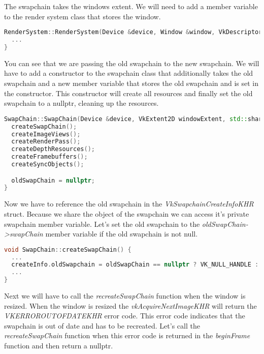 \documentclass[12pt]{report} \usepackage{preamble}
\begin{document}
The swapchain takes the windows extent. We will need to add a member variable to the render system class that stores the window.

\begin{lstlisting}[language=C++]
RenderSystem::RenderSystem(Device &device, Window &window, VkDescriptorSetLayout descriptorSetLayout) : device{device}, window{window} {
  ...
}
\end{lstlisting}

You can see that we are passing the old swapchain to the new swapchain. We will have to add a constructor to the swapchain class that additionally takes the old swapchain
and a new member variable that stores the old swapchain and is set in the constructor. This constructor will create all resources and finally set the old swapchain to a nullptr,
cleaning up the resources.

\begin{lstlisting}[language=C++]
SwapChain::SwapChain(Device &device, VkExtent2D windowExtent, std::shared_ptr<SwapChain> oldSwapChain) : device{device}, windowExtent{windowExtent}, oldSwapChain{oldSwapChain} {
  createSwapChain();
  createImageViews();
  createRenderPass();
  createDepthResources();
  createFramebuffers();
  createSyncObjects();

  oldSwapChain = nullptr;
}
\end{lstlisting}

Now we have to reference the old swapchain in the \textit{VkSwapchainCreateInfoKHR} struct. Because we share the object of the swapchain we can access it's
private swapchain member variable. Let's set the old swapchain to the \textit{oldSwapChain->swapChain} member variable if the old swapchain is not null.

\begin{lstlisting}[language=C++]
void SwapChain::createSwapChain() {
  ...
  createInfo.oldSwapchain = oldSwapChain == nullptr ? VK_NULL_HANDLE : oldSwapChain->swapChain;
  ...
}
\end{lstlisting}

Next we will have to call the \textit{recreateSwapChain} function when the window is resized. When the window is resized the \textit{vkAcquireNextImageKHR}
will return the \textit{VK\textunderscore ERROR\textunderscore OUT\textunderscore OF\textunderscore DATE\textunderscore KHR} error code. This error code
indicates that the swapchain is out of date and has to be recreated. Let's call the \textit{recreateSwapChain} function when this error code is returned
in the \textit{beginFrame} function and then return a nullptr.
\end{document}
